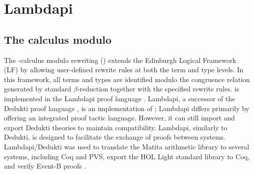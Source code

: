 \chapter{Lambdapi}\label{ch:intro-lambdapi}

\section{The \texorpdfstring{\lp } - calculus modulo}

The \lp-calculus modulo rewriting (\lpm)\index{$\lpm$}  extends the Edinburgh Logical Framework (LF) \cite{lf} by allowing user-defined rewrite rules at both the term and type levels.
In this framework, all terms and types are identified modulo the congruence relation generated by standard $\beta$-reduction together with the specified rewrite rules.
{\lpm} is implemented in the Lambdapi proof language \cite{lambdapi}. Lambdapi, a successor of the Dedukti proof language \cite{Dedukti-ref, Dedukti-ref2}, is an implementation of {\lpm}; Lambdapi differs primarily by offering an integrated proof tactic language.
However, it can still import and export Dedukti theories to maintain compatibility. Lambdapi, similarly to Dedukti, is designed to facilitate the exchange of proofs between systems.
Lambdapi/Dedukti was used to translate \cite{thire:tel-03224039} the Matita arithmetic library to several systems, including Coq and PVS, export \cite{blanqui:hal-04613926} the HOL Light standard library to Coq,
and verify Event-B proofs \cite{eventb2lp}.



